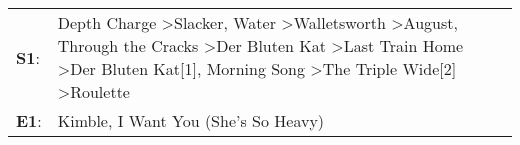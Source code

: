 \begin{supertabular}{p{0.03\textwidth}p{0.92\textwidth}}
 \textbf{S1}:  &  Depth Charge\textsuperscript{} \textgreater \enspace Slacker\textsuperscript{}, \enspace Water\textsuperscript{} \textgreater \enspace Walletsworth\textsuperscript{} \textgreater \enspace August\textsuperscript{}, \enspace Through the Cracks\textsuperscript{} \textgreater \enspace Der Bluten Kat\textsuperscript{} \textgreater \enspace Last Train Home\textsuperscript{} \textgreater \enspace Der Bluten Kat[1]\textsuperscript{}, \enspace Morning Song\textsuperscript{} \textgreater \enspace The Triple Wide[2]\textsuperscript{} \textgreater \enspace Roulette\textsuperscript{}  \enspace  \\
 \textbf{E1}:  &                                                                                                                                                                                                                                                                                                                                                                                                                                                                                                                   Kimble\textsuperscript{}, \enspace I Want You (She's So Heavy)\textsuperscript{}  \enspace  \\
\end{supertabular}
